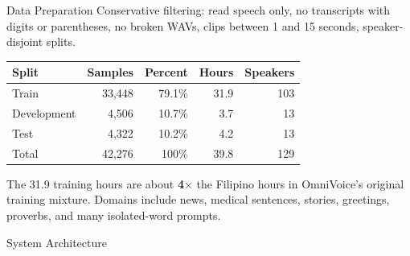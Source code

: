 \documentclass[aspectratio=169]{beamer}
\begin{document}
\begin{frame}{Data Preparation}
  Conservative filtering: read speech only, no transcripts with digits or parentheses, no broken WAVs, clips between 1 and 15 seconds, speaker-disjoint splits.

  \vspace{0.6em}

  \begin{table}
    \centering
    \small
    \begin{tabular}{lrrrr}
      \toprule
      Split & Samples & Percent & Hours & Speakers \\
      \midrule
      Train & 33,448 & 79.1\% & 31.9 & 103 \\
      Development & 4,506 & 10.7\% & 3.7 & 13 \\
      Test & 4,322 & 10.2\% & 4.2 & 13 \\
      \midrule
      Total & 42,276 & 100\% & 39.8 & 129 \\
      \bottomrule
    \end{tabular}
  \end{table}

  \vspace{0.5em}
  \small The 31.9 training hours are about \textbf{4$\times$} the Filipino hours in OmniVoice's original training mixture. Domains include news, medical sentences, stories, greetings, proverbs, and many isolated-word prompts.
\end{frame}

\begin{frame}{System Architecture}
  \centering
  \scriptsize
  \resizebox{!}{0.78\textheight}{}
\end{frame}
\end{document}
